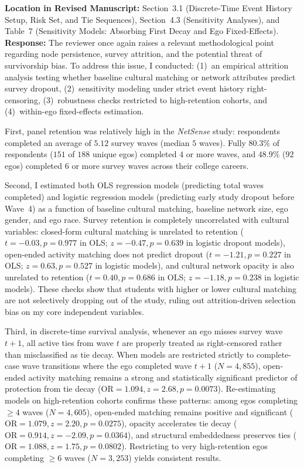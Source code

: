 \documentclass[11pt]{article}
\begin{document}
\noindent\textbf{Location in Revised Manuscript:} Section~3.1 (Discrete-Time Event History Setup, Risk Set, and Tie Sequences), Section~4.3 (Sensitivity Analyses), and Table~7 (Sensitivity Models: Absorbing First Decay and Ego Fixed-Effects).\\[4pt]
\textbf{Response:} The reviewer once again raises a relevant methodological point regarding node persistence, survey attrition, and the potential threat of survivorship bias. To address this issue, I conducted: (1)~an empirical attrition analysis testing whether baseline cultural matching or network attributes predict survey dropout, (2)~sensitivity modeling under strict event history right-censoring, (3)~robustness checks restricted to high-retention cohorts, and (4)~within-ego fixed-effects estimation.

First, panel retention was relatively high in the \textit{NetSense} study: respondents completed an average of $5.12$ survey waves (median $5$ waves). Fully $80.3\%$ of respondents ($151$ of $188$ unique egos) completed $4$ or more waves, and $48.9\%$ ($92$ egos) completed $6$ or more survey waves across their college careers.

Second, I estimated both OLS regression models (predicting total waves completed) and logistic regression models (predicting early study dropout before Wave~4) as a function of baseline cultural matching, baseline network size, ego gender, and ego race. Survey retention is completely uncorrelated with cultural variables: closed-form cultural matching is unrelated to retention ($t = -0.03, p = 0.977$ in OLS; $z = -0.47, p = 0.639$ in logistic dropout models), open-ended activity matching does not predict dropout ($t = -1.21, p = 0.227$ in OLS; $z = 0.63, p = 0.527$ in logistic models), and cultural network opacity is also unrelated to retention ($t = 0.40, p = 0.686$ in OLS; $z = -1.18, p = 0.238$ in logistic models). These checks show that students with higher or lower cultural matching are not selectively dropping out of the study, ruling out attrition-driven selection bias on my core independent variables.

Third, in discrete-time survival analysis, whenever an ego misses survey wave $t+1$, all active ties from wave $t$ are properly treated as right-censored rather than misclassified as tie decay. When models are restricted strictly to complete-case wave transitions where the ego completed wave $t+1$ ($N = 4,855$), open-ended activity matching remains a strong and statistically significant predictor of protection from tie decay ($\text{OR} = 1.094, z = 2.68, p = 0.0073$). Re-estimating models on high-retention cohorts confirms these patterns: among egos completing $\ge 4$ waves ($N = 4,605$), open-ended matching remains positive and significant ($\text{OR} = 1.079, z = 2.20, p = 0.0275$), opacity accelerates tie decay ($\text{OR} = 0.914, z = -2.09, p = 0.0364$), and structural embeddedness preserves ties ($\text{OR} = 1.088, z = 1.75, p = 0.0802$). Restricting to very high-retention egos completing $\ge 6$ waves ($N = 3,253$) yields consistent results.
\end{document}
